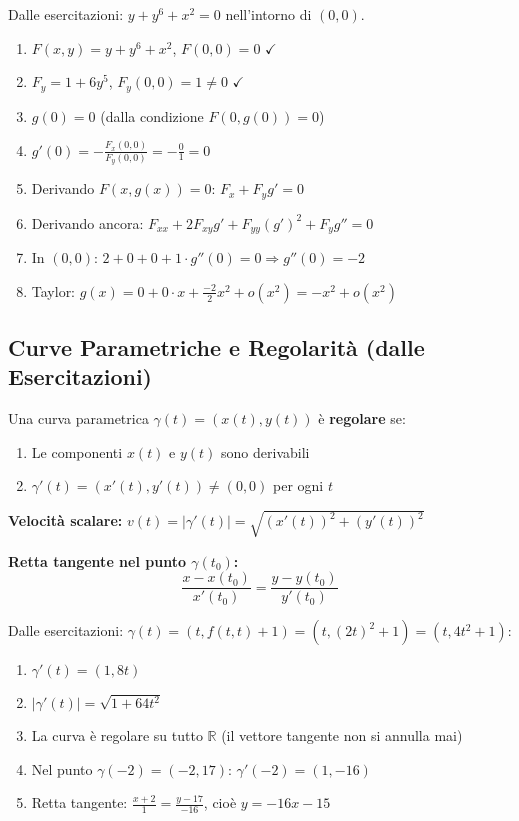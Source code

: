 \begin{esempio}
Dalle esercitazioni: $y + y^6 + x^2 = 0$ nell'intorno di $(0,0)$.

\begin{enumerate}
    \item \(F(x,y) = y + y^6 + x^2\), \(F(0,0) = 0\) \(\checkmark\)
    \item \(F_y = 1 + 6y^5\), \(F_y(0,0) = 1 \neq 0\) \(\checkmark\)
    \item $g(0) = 0$ (dalla condizione $F(0,g(0)) = 0$)
    \item $g'(0) = -\frac{F_x(0,0)}{F_y(0,0)} = -\frac{0}{1} = 0$
    \item Derivando $F(x,g(x)) = 0$: $F_x + F_y g' = 0$
    \item Derivando ancora: $F_{xx} + 2F_{xy}g' + F_{yy}(g')^2 + F_y g'' = 0$
    \item In $(0,0)$: $2 + 0 + 0 + 1 \cdot g''(0) = 0 \Rightarrow g''(0) = -2$
    \item Taylor: $g(x) = 0 + 0 \cdot x + \frac{-2}{2}x^2 + o(x^2) = -x^2 + o(x^2)$
\end{enumerate}
\end{esempio}

\subsection{Curve Parametriche e Regolarità (dalle Esercitazioni)}

\begin{info}
Una curva parametrica $\gamma(t) = (x(t), y(t))$ è \textbf{regolare} se:
\begin{enumerate}
    \item Le componenti $x(t)$ e $y(t)$ sono derivabili
    \item $\gamma'(t) = (x'(t), y'(t)) \neq (0,0)$ per ogni $t$
\end{enumerate}

\textbf{Velocità scalare:} $v(t) = |\gamma'(t)| = \sqrt{(x'(t))^2 + (y'(t))^2}$

\textbf{Retta tangente nel punto $\gamma(t_0)$:}
\[ \frac{x - x(t_0)}{x'(t_0)} = \frac{y - y(t_0)}{y'(t_0)} \]
\end{info}

\begin{esempio}
Dalle esercitazioni: $\gamma(t) = (t, f(t,t) + 1) = (t, (2t)^2 + 1) = (t, 4t^2 + 1)$:

\begin{enumerate}
    \item $\gamma'(t) = (1, 8t)$
    \item $|\gamma'(t)| = \sqrt{1 + 64t^2}$
    \item La curva è regolare su tutto $\mathbb{R}$ (il vettore tangente non si annulla mai)
    \item Nel punto $\gamma(-2) = (-2, 17)$: $\gamma'(-2) = (1, -16)$
    \item Retta tangente: $\frac{x+2}{1} = \frac{y-17}{-16}$, cioè $y = -16x - 15$
\end{enumerate}
\end{esempio}

